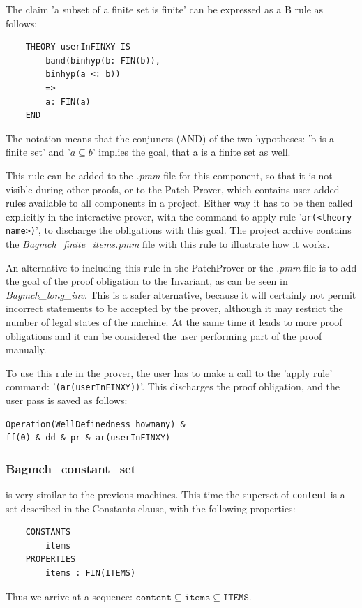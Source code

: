 \documentclass[11pt,journal]{IEEEtran}
\begin{document}
	The claim 'a subset of a finite set is finite' can be expressed as a B rule as follows:
		
	\begin{lstlisting}
	THEORY userInFINXY IS
		band(binhyp(b: FIN(b)), 
		binhyp(a <: b))
		=>
		a: FIN(a)
	END
	\end{lstlisting}
	
	The notation means that the conjuncts (AND) of the two hypotheses: 'b is a finite set' and '$a \subseteq b$' implies the goal, that a is a finite set as well.
	
	This rule can be added to the \emph{.pmm} file for this component, so that it is not visible during other proofs, or to the Patch Prover, which contains user-added rules available to all components in a project. Either way it has to be then called explicitly in the interactive prover, with the command to apply rule '\texttt{ar(<theory name>)}', to discharge the obligations with this goal. The project archive contains the \emph{Bagmch\_finite\_items.pmm} file with this rule to illustrate how it works. 
	
	An alternative to including this rule in the PatchProver or the \emph{.pmm} file is to add the goal of the proof obligation to the Invariant, as can be seen in \emph{Bagmch\_long\_inv}. This is a safer alternative, because it will certainly not permit incorrect statements to be accepted by the prover, although it may restrict the number of legal states of the machine. At the same time it leads to more proof obligations and it can be considered the user performing part of the proof manually.
	
	To use this rule in the prover, the user has to make a call to the 'apply rule' command: '\texttt{(ar(userInFINXY))}'. This discharges the proof obligation, and the user pass is saved as follows:
\begin{lstlisting}
Operation(WellDefinedness_howmany) & 
ff(0) & dd & pr & ar(userInFINXY)
	\end{lstlisting}
	
	\subsubsection{Bagmch\_constant\_set} is very similar to the previous machines. This time the superset of \texttt{content} is a set described in the Constants clause, with the following properties:
	
	\begin{lstlisting}
	CONSTANTS
		items
	PROPERTIES
		items : FIN(ITEMS)
	\end{lstlisting}
	Thus we arrive at a sequence: $\texttt{content} \subseteq \texttt{items} \subseteq \texttt{ITEMS}$.
	
\end{document}
